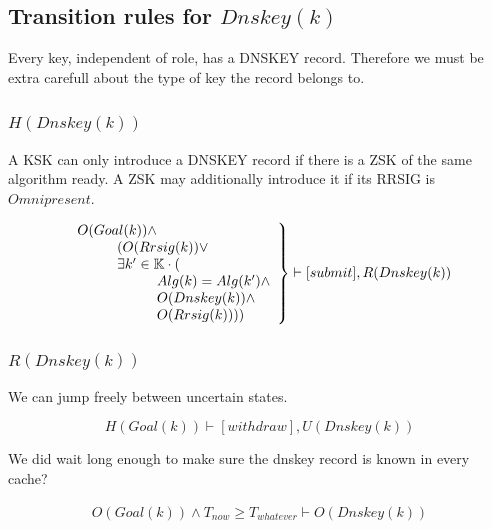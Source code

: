 \documentclass[twoside,english, a4paper]{article}
\newcommand{\mathbox}[1]{#1}
\begin{document}
\subsection{Transition rules for $Dnskey(k)$}

Every key, independent of role, has a DNSKEY record. Therefore we must
be extra carefull about the type of key the record belongs to.

\subsubsection{$H(Dnskey(k))$}

\mathbox{

	A KSK can only introduce a DNSKEY record if there is a ZSK of the
	same algorithm ready. A ZSK may additionally introduce it if its 
	RRSIG is $Omnipresent$.

	\begin{equation}
		\left.
		\begin{array}{l}
			O(Goal(k)) \wedge \\
\hskip 1cm	(O(Rrsig(k)) \vee \\
\hskip 1cm	\exists k' \in \mathbb{K} \cdot ( \\
\hskip 2cm		Alg(k)=Alg(k') \wedge \\
\hskip 2cm		O(Dnskey(k)) \wedge \\
\hskip 2cm		O(Rrsig(k))))\\
		\end{array}
		\right\} \vdash [submit], R(Dnskey(k))
	\end{equation}
}

\subsubsection{$R(Dnskey(k))$}

\mathbox{

	We can jump freely between uncertain states.
	
	\begin{equation}
			H(Goal(k)) \vdash [withdraw], U(Dnskey(k))
	\end{equation}

	We did wait long enough to make sure the dnskey record is known in 
	every cache?
	
	\begin{equation}
		\begin{split}
			O(Goal(k)) \wedge T_{now} \geq T_{whatever} \vdash O(Dnskey(k))
		\end{split}
	\end{equation}
}
\end{document}
